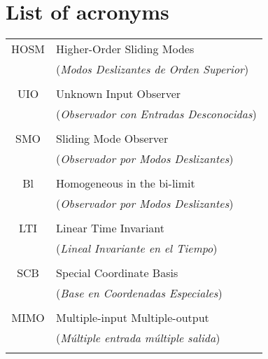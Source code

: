 \chapter*{List of acronyms} %
\begin{tabular}{cl}
	HOSM	&\hspace{1.5cm} Higher-Order Sliding Modes\\
			&\hspace{1.5cm} (\textit{Modos Deslizantes de Orden Superior})\\\\
	UIO		&\hspace{1.5cm} Unknown Input Observer	\\
			&\hspace{1.5cm} (\textit{Observador con Entradas Desconocidas})\\\\
	SMO		&\hspace{1.5cm} Sliding Mode Observer\\
			&\hspace{1.5cm} (\textit{Observador por Modos Deslizantes})\\\\
	Bl		&\hspace{1.5cm} Homogeneous in the bi-limit\\
			&\hspace{1.5cm} (\textit{Observador por Modos Deslizantes})\\\\
	LTI	   	&\hspace{1.5cm} Linear Time Invariant \\
			&\hspace{1.5cm} (\textit{Lineal Invariante en el Tiempo})\\\\
	SCB	   	&\hspace{1.5cm} Special Coordinate Basis\\
			&\hspace{1.5cm} (\textit{Base en Coordenadas Especiales})\\\\
	MIMO	&\hspace{1.5cm} Multiple-input Multiple-output\\
			&\hspace{1.5cm} (\textit{Múltiple entrada múltiple salida})\\\\

\end{tabular}
